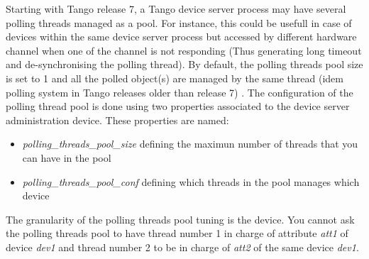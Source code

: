 Starting with Tango release 7, a Tango device server process may have
several polling threads managed as a pool. For instance, this could
be usefull in case of devices within the same device server process
but accessed by different hardware channel when one of the channel
is not responding (Thus generating long timeout and de-synchronising
the polling thread). By default, the polling threads pool size is
set to 1 and all the polled object(s) are managed by the same thread
(idem polling system in Tango releases older than release 7) . The
configuration of the polling thread pool is done using two properties
associated to the device server administration device. These properties
are named:
\begin{itemize}
\item \emph{polling\_threads\_pool\_size}
defining the maximun number of threads that you can have in the pool
\item \emph{polling\_threads\_pool\_conf}
defining which threads in the pool manages which device
\end{itemize}
The granularity of the polling threads pool tuning is the device.
You cannot ask the polling threads pool to have thread number 1 in
charge of attribute \emph{att1} of device \emph{dev1} and thread number
2 to be in charge of \emph{att2} of the same device \emph{dev1}.

